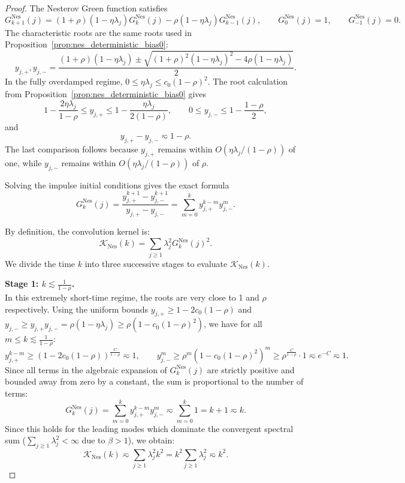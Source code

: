 \begin{proof}
The Nesterov Green function satisfies
\[
    G_{k+1}^{\mathrm{Nes}}(j)
    =
    (1+\rho)(1-\eta\lambda_j)G_k^{\mathrm{Nes}}(j)
    -\rho(1-\eta\lambda_j)G_{k-1}^{\mathrm{Nes}}(j),
    \qquad
    G_0^{\mathrm{Nes}}(j)=1,
    \qquad
    G_{-1}^{\mathrm{Nes}}(j)=0.
\]
The characteristic roots are the same roots used in Proposition~\ref{prop:nes_deterministic_bias0}:
\[
    y_{j,+},y_{j,-}
    =
    \frac{(1+\rho)(1-\eta\lambda_j)
    \pm
    \sqrt{(1+\rho)^2(1-\eta\lambda_j)^2-4\rho(1-\eta\lambda_j)}}{2}.
\]
In the fully overdamped regime, \(0\le\eta\lambda_j\le c_0(1-\rho)^2\). The root calculation from Proposition~\ref{prop:nes_deterministic_bias0} gives
\[
    1-\frac{2\eta\lambda_j}{1-\rho}
    \le
    y_{j,+}
    \le
    1-\frac{\eta\lambda_j}{2(1-\rho)},
    \qquad
    0\le y_{j,-}\le1-\frac{1-\rho}{2},
\]
and
\[
    y_{j,+}-y_{j,-}
    \eqsim
    1-\rho.
\]
The last comparison follows because \(y_{j,+}\) remains within \(O(\eta\lambda_j/(1-\rho))\) of one, while \(y_{j,-}\) remains within \(O(\eta\lambda_j/(1-\rho))\) of \(\rho\).

Solving the impulse initial conditions gives the exact formula
\[
    G_k^{\mathrm{Nes}}(j)
    =
    \frac{y_{j,+}^{k+1}-y_{j,-}^{k+1}}{y_{j,+}-y_{j,-}} = \sum_{m=0}^{k} y_{j,+}^{k-m} y_{j,-}^m.
\]

By definition, the convolution kernel is:
\[
    \mathcal K_{\mathrm{Nes}}(k) = \sum_{j\ge1}\lambda_j^2 G_k^{\mathrm{Nes}}(j)^2.
\]
We divide the time $k$ into three successive stages to evaluate $\mathcal K_{\mathrm{Nes}}(k)$.

\textbf{Stage 1: $k \lesssim \frac{1}{1-\rho}$.} \\
In this extremely short-time regime, the roots are very close to 1 and $\rho$ respectively. Using the uniform bounds $y_{j,+} \ge 1 - 2c_0(1-\rho)$ and $y_{j,-} \ge y_{j,+}y_{j,-} = \rho(1-\eta\lambda_j) \ge \rho(1-c_0(1-\rho)^2)$, we have for all $m \le k \lesssim \frac{1}{1-\rho}$:
\[
    y_{j,+}^{k-m} \ge \left(1 - 2c_0(1-\rho)\right)^{\frac{C}{1-\rho}} \eqsim 1, \qquad y_{j,-}^m \ge \rho^m \left(1-c_0(1-\rho)^2\right)^m \ge \rho^{\frac{C}{1-\rho}} \cdot 1 \eqsim e^{-C} \eqsim 1.
\]
Since all terms in the algebraic expansion of $G_k^{\mathrm{Nes}}(j)$ are strictly positive and bounded away from zero by a constant, the sum is proportional to the number of terms:
\[
    G_k^{\mathrm{Nes}}(j) = \sum_{m=0}^{k} y_{j,+}^{k-m} y_{j,-}^m \eqsim \sum_{m=0}^{k} 1 = k+1 \eqsim k.
\]
Since this holds for the leading modes which dominate the convergent spectral sum ($\sum_{j\ge1}\lambda_j^2 < \infty$ due to $\beta > 1$), we obtain:
\[
    \mathcal K_{\mathrm{Nes}}(k) \eqsim \sum_{j\ge1}\lambda_j^2 k^2 = k^2 \sum_{j\ge1}\lambda_j^2 \eqsim k^2.
\]


\end{proof}
